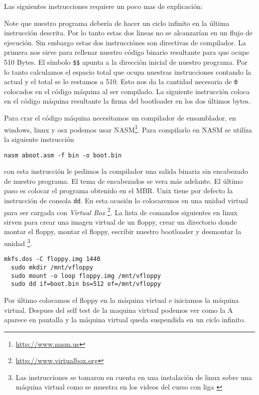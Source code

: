 

Las siguientes instrucciones requiere un poco mas de explicación:



Note que nuestro programa debería de hacer un ciclo infinito en la última
instrucción descrita. Por lo tanto estas dos lineas no se alcanzarían en un
flujo de ejecución. Sin embargo estas dos instrucciónes son directivas de
compilador. La primera nos sirve para rellenar nuestro código binario
resultante para que ocupe 510 Bytes. El símbolo \texttt{\$\$} apunta a la
dirección inicial de nuestro programa. Por lo tanto calculamos el espacio total
que ocupa nuestras instrucciones contando la actual y el total se lo restamos a
510. Esto nos da la cantidad necesaria de \texttt{0} colocados en el código
máquina al ser compilado. La siguiente instrucción coloca en el código máquina
resultante la firma del bootloader en los dos últimos bytes.

Para crar el código máquina necesitamos un compilador de ensamblador, en
windows, linux y osx podemos usar NASM\footnote{\url{http://www.nasm.us}}. Para
compilarlo en NASM se utilíza la siguiente instrucción


\begin{lstlisting}[style=custombash, caption=Compilando el bootloader con NASM]
  nasm aboot.asm -f bin -o boot.bin
\end{lstlisting}

con esta instrucción le pedimos la compilador una salida binaria sin encabezado
de nuestro programa. El tema de encabezados se vera más adelante. El último
paso es colocar el programa obtenido en el MBR. Unix tiene por defecto la
instrucción de consola \texttt{dd}. En esta ocasión lo colocaremos en una
unidad virtual para ser cargada con \emph{Virtual Box} \footnote{\url{http://www.virtualbox.org}}.
La lista de comandos siguientes en linux sirven para crear una imagen virtual
de un floppy, crear un directorio donde montar el floppy, montar el floppy,
escribir nuestro bootloader y desmontar la unidad \footnote{Las instrucciones
  se tomaron en cuenta en una instalación de linux sobre una máquina virtual
  como se muestra en los videos del curso con liga \url{}}. 

\begin{lstlisting}[style=custombash, caption=Preparando un floppy virtual]
  mkfs.dos -C floppy.img 1440
  sudo mkdir /mnt/vfloppy
  sudo mount -o loop floppy.img /mnt/vfloppy 
  sudo dd if=boot.bin bs=512 of=/mnt/vfloppy
\end{lstlisting}

Por último colocamos el floppy en la máquina virtual e iniciamos la máquina
virtual. Despues del self test de la maquina virtual podemos ver como la A aparece en
pantalla y la máquina virtual queda suspendida en un ciclo infinito.
%                   

